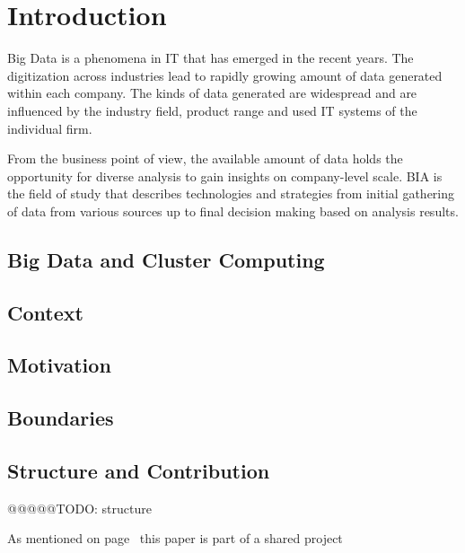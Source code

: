 \chapter{Introduction}

Big Data is a phenomena in \ac{IT} that has emerged in the recent years.
The digitization across industries lead to rapidly growing amount of data generated
within each company.
The kinds of data generated are widespread 
and are influenced by the industry field, product range and used \ac{IT} systems 
of the individual firm.

From the business point of view, the available amount of data 
holds the opportunity for diverse analysis to gain insights on company-level scale.
\ac{BIA} is the field of study that describes technologies and strategies 
from initial gathering of data from various sources 
up to final decision making based on analysis results.    

\section{Big Data and Cluster Computing}


\section{Context}

\section{Motivation}

\section{Boundaries}

\section{Structure and Contribution}
\label{intro:structure}

@@@@@TODO: structure

As mentioned on page~\pageref{prenotes} this paper is part of a shared project